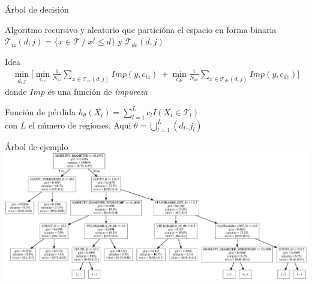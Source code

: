 \documentclass[xcolor=x11names]{beamer}
\begin{document}

\begin{frame}[shrink=2]{Árbol de decisión}

Algoritmo recursivo y aleatorio que particióna el espacio en forma binaria $\mathcal{T}_{iz}(d,j) = \{x \in \mathcal{T} \ / \ x^j \leq d \}$ y $\mathcal{T}_{de}(d,j)$

	\begin{block}{Idea}
		\begin{align*}
			\min_{d, j} \big[ \min_{c_{iz} }  \frac{1}{N_{iz}}\sum_{x \in \mathcal{T}_{iz}(d,j) } Imp(y,c_{iz}) \
			+  \min_{c_{de}}  \frac{1}{N_{de}}\sum_{x \in \mathcal{T}_{de}(d,j) } Imp(y,c_{de}) \big]
		\end{align*}
			donde $Imp$ es una función de \textit{impureza} 
	\end{block}

	\begin{block}{Función de pérdida}
	\small
	{
	\center
	$h_{\theta}(X_i) = \sum_{l=1}^L c_l I(X_i \in \mathcal{T}_l)$ \\
	}
 	con $L$ el número de regiones. Aqui $\theta = \bigcup\limits_{l=1}^{L} (d_l,j_l)$


	\end{block}
\end{frame}


\begin{frame}{Árbol de ejemplo}
		\includegraphics[width = 0.9 \paperwidth, height = 0.7 \paperheight,
										trim = 0.2 80 0.2 0.2cm, left, clip = true]{decision_tree/full_tree_map.png}
\end{frame}
\end{document}
